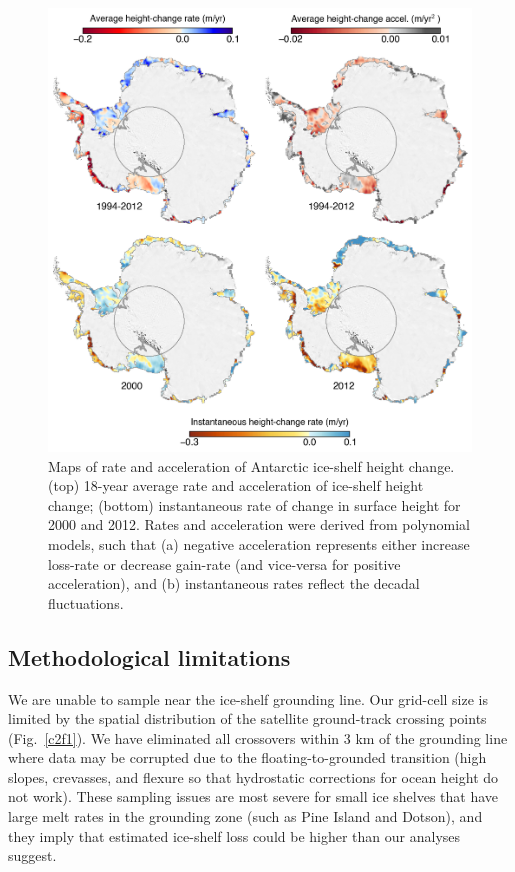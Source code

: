 \begin{figure}[!hb]
  \centering
  \includegraphics[width=\textwidth]{img/map_4panels_v5.png}
  \caption[Maps of rate and acceleration of Antarctic ice-shelf height]{
  \ssp \footnotesize
  Maps of rate and acceleration of Antarctic ice-shelf height change. (top) 18-year average rate and acceleration of ice-shelf height change; (bottom) instantaneous rate of change in surface height for 2000 and 2012. Rates and acceleration were derived from polynomial models, such that (a) negative acceleration represents either increase loss-rate or decrease gain-rate (and vice-versa for positive acceleration), and (b) instantaneous rates reflect the decadal fluctuations.
  } 
  \label{c2f9}
\end{figure}


\subsection{Methodological limitations}

We are unable to sample near the ice-shelf grounding line. Our grid-cell size is limited by the spatial distribution of the satellite ground-track crossing points (Fig.~\ref{c2f1}). We have eliminated all crossovers within 3 km of the grounding line where data may be corrupted due to the floating-to-grounded transition (high slopes, crevasses, and flexure so that hydrostatic corrections for ocean height do not work). These sampling issues are most severe for small ice shelves that have large melt rates in the grounding zone (such as Pine Island and Dotson), and they imply that estimated ice-shelf loss could be higher than our analyses suggest.

